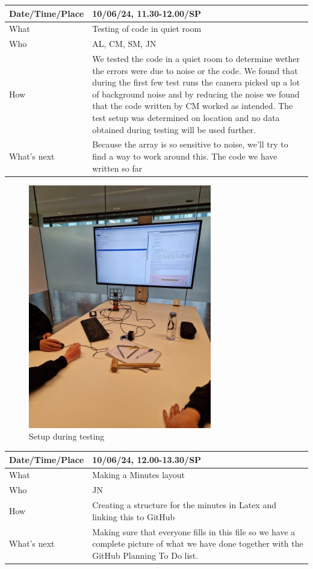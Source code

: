\documentclass{article}
\begin{document}
\begin{table}[H]
\begin{tabular}{|p{1.5in}|p{4in}|}
\hline
Date/Time/Place & 10/06/24, 11.30-12.00/SP \\ \hline
What            &  Testing of code in quiet room\\ \hline
Who             &  AL, CM, SM, JN\\ \hline
How             &  We tested the code in a quiet room to determine wether the errors were due to noise or the code. We found that during the first few test runs the camera picked up a lot of background noise and by reducing the noise we found that the code written by CM worked as intended. The test setup was determined on location and no data obtained during testing will be used further.\\ \hline
What's next     &  Because the array is so sensitive to noise, we'll try to find a way to work around this. The code we have written so far\\ \hline
\end{tabular}
\end{table}
\begin{figure}[H]
    \centering
    \includegraphics[width=8cm, angle =270]{20240610_113743.jpg}
    \caption{Setup during testing}   
\end{figure}


\begin{table}[H]
\begin{tabular}{|p{1.5in}|p{4in}|}
\hline
Date/Time/Place &  10/06/24, 12.00-13.30/SP\\ \hline
What            &  Making a Minutes layout\\ \hline
Who             &  JN\\ \hline
How             &  Creating a structure for the minutes in Latex and linking this to GitHub\\ \hline
What's next     &  Making sure that everyone fills in this file so we have a complete picture of what we have done together with the GitHub Planning To Do list.\\ \hline
\end{tabular}
\end{table}
\end{document}
